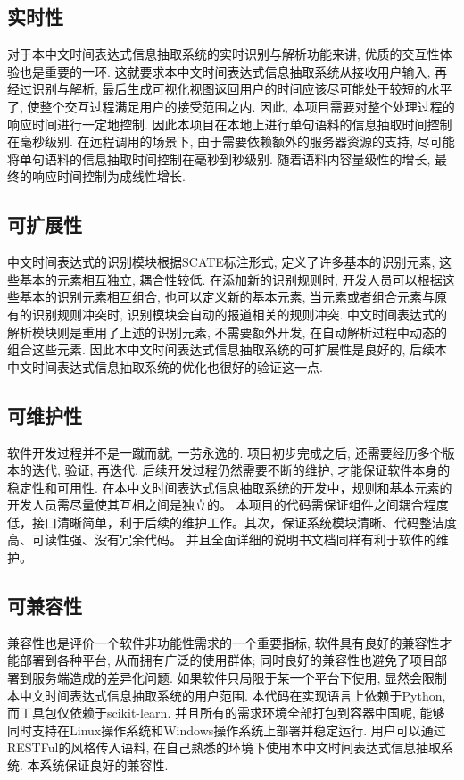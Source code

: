 \subsection{实时性}

对于本中文时间表达式信息抽取系统的实时识别与解析功能来讲, 优质的交互性体验也是重要的一环. 
这就要求本中文时间表达式信息抽取系统从接收用户输入, 再经过识别与解析, 最后生成可视化视图返回用户的时间应该尽可能处于较短的水平了, 使整个交互过程满足用户的接受范围之内.
因此, 本项目需要对整个处理过程的响应时间进行一定地控制. 因此本项目在本地上进行单句语料的信息抽取时间控制在毫秒级别. 
在远程调用的场景下, 由于需要依赖额外的服务器资源的支持, 尽可能将单句语料的信息抽取时间控制在毫秒到秒级别. 
随着语料内容量级性的增长, 最终的响应时间控制为成线性增长.

\subsection{可扩展性}

中文时间表达式的识别模块根据SCATE标注形式, 定义了许多基本的识别元素, 这些基本的元素相互独立, 耦合性较低. 
在添加新的识别规则时, 开发人员可以根据这些基本的识别元素相互组合, 也可以定义新的基本元素, 当元素或者组合元素与原有的识别规则冲突时, 
识别模块会自动的报道相关的规则冲突.
中文时间表达式的解析模块则是重用了上述的识别元素, 不需要额外开发, 在自动解析过程中动态的组合这些元素. 
因此本中文时间表达式信息抽取系统的可扩展性是良好的, 后续本中文时间表达式信息抽取系统的优化也很好的验证这一点.


\subsection{可维护性}

软件开发过程并不是一蹴而就, 一劳永逸的. 项目初步完成之后, 还需要经历多个版本的迭代, 验证, 再迭代. 
后续开发过程仍然需要不断的维护, 才能保证软件本身的稳定性和可用性.
在本中文时间表达式信息抽取系统的开发中，规则和基本元素的开发人员需尽量使其互相之间是独立的。
本项目的代码需保证组件之间耦合程度低，接口清晰简单，利于后续的维护工作。其次，保证系统模块清晰、代码整洁度高、可读性强、没有冗余代码。
并且全面详细的说明书文档同样有利于软件的维护。

\subsection{可兼容性}

兼容性也是评价一个软件非功能性需求的一个重要指标, 软件具有良好的兼容性才能部署到各种平台, 从而拥有广泛的使用群体; 同时良好的兼容性也避免了项目部署到服务端造成的差异化问题.
如果软件只局限于某一个平台下使用, 显然会限制本中文时间表达式信息抽取系统的用户范围. 本代码在实现语言上依赖于Python, 而工具包仅依赖于scikit-learn. 
并且所有的需求环境全部打包到容器中国呢, 能够同时支持在Linux操作系统和Windows操作系统上部署并稳定运行. 
用户可以通过RESTFul的风格传入语料, 在自己熟悉的环境下使用本中文时间表达式信息抽取系统. 本系统保证良好的兼容性.

